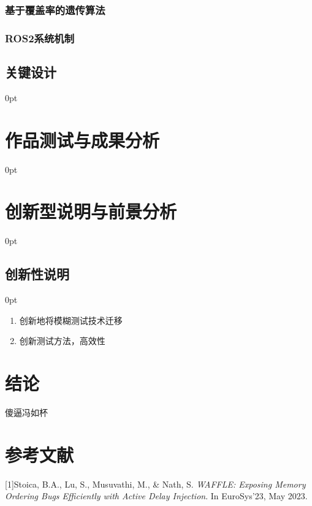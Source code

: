 \documentclass[zihao=-4]{ctexart}
\newcommand{\setParDis}{\setlength {\parskip} {0pt} }
\begin{document}
\begin{spacing}{1.5}
\subsubsection{基于覆盖率的遗传算法}
\subsubsection{ROS2系统机制}


\subsection{关键设计}
\setParDis %


\section{作品测试与成果分析}
\setParDis %


\section{创新型说明与前景分析}
\setParDis %
\subsection{创新性说明}
\setParDis %
\begin{enumerate}
  \item 创新地将模糊测试技术迁移
  \item 创新测试方法，高效性
\end{enumerate}

\section*{结论}%
傻逼冯如杯


\end{spacing}
\newpage

\section*{参考文献} %
[1]Stoica, B.A., Lu, S., Musuvathi, M., \& Nath, S. \textit{WAFFLE: Exposing Memory Ordering Bugs Efficiently with Active Delay Injection}. In EuroSys'23, May 2023. 
\end{document}
